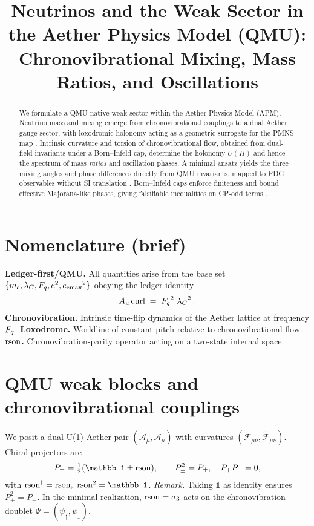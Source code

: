\documentclass[coverpage]{qadi-article}
\title{Neutrinos and the Weak Sector in the Aether Physics Model (QMU):\\
Chronovibrational Mixing, Mass Ratios, and Oscillations}
\author{\QADIAuthor{David W. Thomson III}{0000-0002-5830-5427}}
\date{\QADIDate}
\begin{document}
\QADIMakeTitle
{}
\begin{abstract}
We formulate a QMU-native weak sector within the Aether Physics Model (APM). Neutrino mass and mixing emerge from chronovibrational couplings to a dual Aether gauge sector, with loxodromic holonomy acting as a geometric surrogate for the PMNS map \cite{Maki1962,GribovPontecorvo1969}. Intrinsic curvature and torsion of chronovibrational flow, obtained from dual-field invariants under a Born--Infeld cap, determine the holonomy \(U(H)\) and hence the spectrum of mass \emph{ratios} and oscillation phases. A minimal ansatz yields the three mixing angles and phase differences directly from QMU invariants, mapped to PDG observables without SI translation \cite{SuperK1998,SNO2002,KamLAND2003,DayaBay2012,PDG2024Neutrino}. Born--Infeld caps enforce finiteness and bound effective Majorana-like phases, giving falsifiable inequalities on CP-odd terms \cite{BI1934,Dirac1960BI,FradkinTseytlin1985}.
\end{abstract}

\section*{Nomenclature (brief)}
\textbf{Ledger-first/QMU.} All quantities arise from the base set \(\{m_{\mathrm e},\lambda_C,F_q,e^{2},{e_{\mathrm{emax}}}^{2}\}\) obeying the ledger identity
\begin{equation}
A_u\,\mathrm{curl} \;=\; \mathop{\kern0pt F_{q}}\nolimits^{2}\,\mathop{\kern0pt \lambda_{C}}\nolimits^{2}.
\label{eq:ledger}
\end{equation}
\textbf{Chronovibration.} Intrinsic time-flip dynamics of the Aether lattice at frequency \(F_q\).  
\textbf{Loxodrome.} Worldline of constant pitch relative to chronovibrational flow.  
\textbf{\(\mathrm{rson}\).} Chronovibration-parity operator acting on a two-state internal space.

\section{QMU weak blocks and chronovibrational couplings}
We posit a dual U(1) Aether pair \((\mathcal A_\mu,\widetilde{\mathcal A}_\mu)\) with curvatures \((\mathcal F_{\mu\nu},\widetilde{\mathcal F}_{\mu\nu})\).  
Chiral projectors are
\begin{equation}
P_\pm=\tfrac12(\mathbb1\pm\rson),\qquad P_\pm^2=P_\pm,\quad P_+P_-=0,
\label{eq:projectors}
\end{equation}
with \(\rson^\dagger=\rson,\ \rson^2=\mathbb1\).
\emph{Remark.} Taking \(\mathbb1\) as identity ensures \(P_\pm^2=P_\pm\).
In the minimal realization, \(\mathrm{rson}=\sigma_3\) acts on the chronovibration doublet \(\Psi=(\psi_\uparrow,\psi_\downarrow)\).
\end{document}
